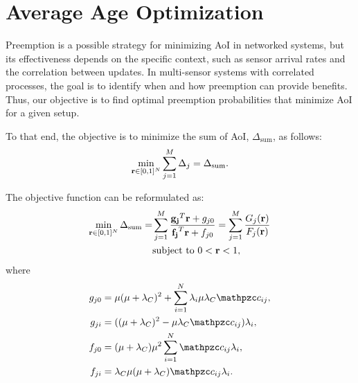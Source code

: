 \section{Average Age Optimization}\label{aoi-opt}


Preemption is a possible strategy for minimizing AoI in networked systems, but its effectiveness depends on the specific context, such as sensor arrival rates and the correlation between updates. In multi-sensor systems with correlated processes, the goal is to identify when and how preemption can provide benefits. Thus, our objective is to find optimal preemption probabilities that minimize AoI for a given setup.



To that end, the objective is to minimize the sum of AoI, $\Delta_{\text{sum}}$, as follows:
\begin{align}
\min_{\mathbf{r} \in [0,1]^{N}} \sum_{j=1}^{M}\Delta_j = \Delta_{\text{sum}}.
\end{align}


The objective function can be reformulated as:
\begin{align}\label{objective_func}
    \min_{\mathbf{r} \in [0,1]^{N}}\Delta_{\text{sum}} =& 
    \sum_{j=1}^{M} \frac{\mathbf{g_j}^T \mathbf{r} + g_{j0}}{\mathbf{f_j}^T \mathbf{r} + f_{j0}} = \sum_{j=1}^{M} \frac{G_j(\mathbf{r})}{F_j(\mathbf{r})}
    \\ \nonumber
    &\text{subject to } 0 < \mathbf{r} < 1,
\end{align}
where
\vspace{-15pt}
\begin{align}
    g_{j0} &= \mu(\mu + \lambda_C)^2 + \sum_{i=1}^{N} \lambda_{i}\mu\lambda_C \nc_{ij}, \\
    g_{ji} &= ((\mu + \lambda_C)^2 - \mu\lambda_C \nc_{ij})\lambda_{i}, \\
    f_{j0} &= (\mu + \lambda_C) \mu^2 \sum_{i=1}^{N} \nc_{ij} \lambda_{i}, \\
    f_{ji} &= \lambda_C \mu (\mu + \lambda_C) \nc_{ij} \lambda_{i}.
\end{align} 

